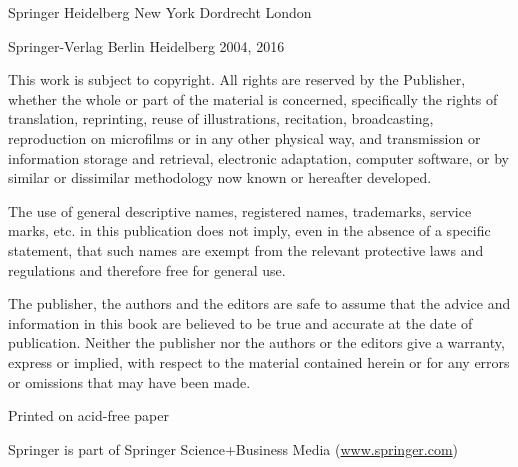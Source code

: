 \documentclass{article}
\begin{document}
Springer Heidelberg New York Dordrecht London

\textcopyright Springer-Verlag Berlin Heidelberg 2004, 2016

This work is subject to copyright. All rights are reserved by the Publisher, whether the whole or part of
the material is concerned, specifically the rights of translation, reprinting, reuse of illustrations, recitation,
broadcasting, reproduction on microfilms or in any other physical way, and transmission or information
storage and retrieval, electronic adaptation, computer software, or by similar or dissimilar methodology
now known or hereafter developed.

The use of general descriptive names, registered names, trademarks, service marks, etc. in this publication
does not imply, even in the absence of a specific statement, that such names are exempt from the relevant
protective laws and regulations and therefore free for general use.

The publisher, the authors and the editors are safe to assume that the advice and information in this book
are believed to be true and accurate at the date of publication. Neither the publisher nor the authors or
the editors give a warranty, express or implied, with respect to the material contained herein or for any
errors or omissions that may have been made.

Printed on acid-free paper

Springer is part of Springer Science+Business Media (\url{www.springer.com})
\end{document}
